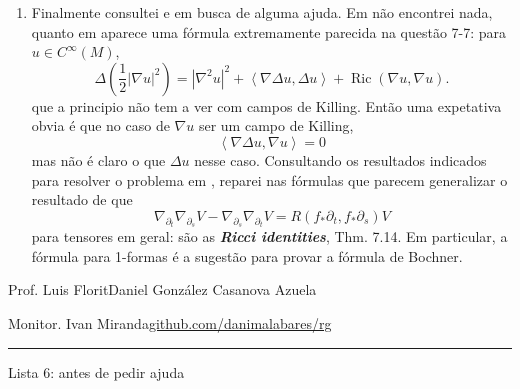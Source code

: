 \begin{enumerate}
\item Finalmente consultei \cite{doc} e \cite{ler} em busca de alguma ajuda. Em \cite{doc} não encontrei nada, quanto em \cite{ler} aparece uma fórmula extremamente parecida na questão 7-7: para \(u \in C^\infty(M)\),
	\[\Delta\left(\frac{1}{2}|\nabla u|^2\right) =|\nabla^2 u|^2+\left<\nabla \Delta u,\Delta u\right>+ \operatorname{Ric}(\nabla u,\nabla u).\]
que a principio não tem a ver com campos de Killing. Então uma expetativa obvia é que no caso de \(\nabla u\) ser um campo de Killing,
\[\left< \nabla \Delta u, \nabla u\right>=0\]
mas não é claro o que \(\Delta u\) nesse caso. Consultando os resultados indicados para resolver o problema em \cite{ler}, reparei nas fórmulas que parecem generalizar o resultado de que
\[\nabla_{\partial_t}\nabla_{\partial_s}V-\nabla_{\partial_s}\nabla_{\partial_t}V=R(f_*\partial_t,f_*\partial_s)V\]
para tensores em geral: são as \textit{\textbf{Ricci identities}}, Thm. 7.14. Em particular, a fórmula para 1-formas é a sugestão para provar a fórmula de Bochner.

\end{enumerate}

\clearpage

\iffalse
\clearpage
\begin{minipage}{\textwidth}
	\begin{minipage}{1\textwidth}
		{\small Prof. Luis Florit\hfill Daniel González Casanova Azuela}
		
		{\small Monitor. Ivan Miranda\hfill\href{https://github.com/danimalabares/rg}{github.com/danimalabares/rg}}
	\end{minipage}
\end{minipage}\vspace{.2cm}\hrule

\vspace{10pt}
{\huge Lista 6: antes de pedir ajuda}

